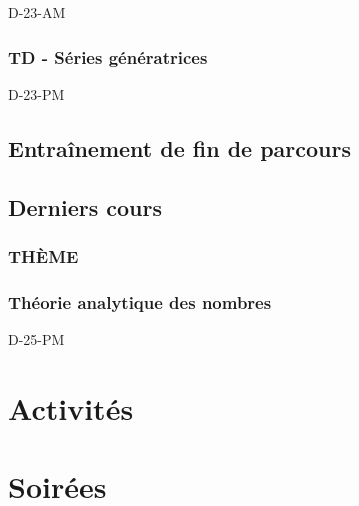 \documentclass[poly,trombi]{valbonne}
\begin{document}
{D-23-AM}

\subsection{TD - Séries génératrices}

{D-23-PM}


\section{Entraînement de fin de parcours}



\section{Derniers cours}

\subsection{THÈME}


\subsection{Théorie analytique des nombres}

{D-25-PM}


\chapter{Activités}


\chapter{\hspace{2mm}Soirées}

\minitoc \clearpage









\end{document}
